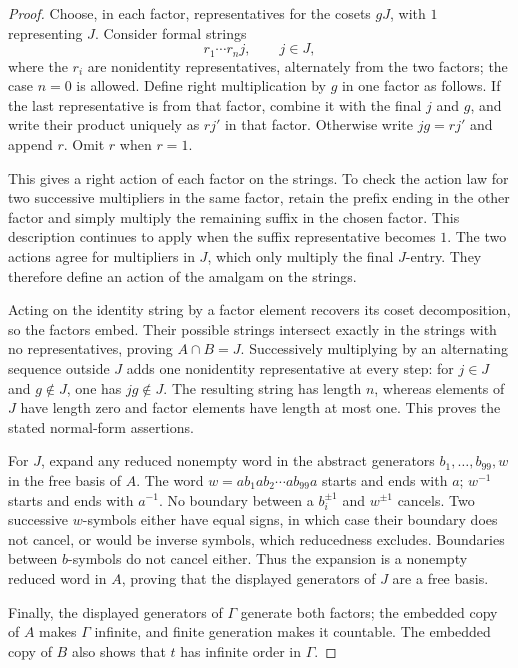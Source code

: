 \begin{proof}
Choose, in each factor, representatives for the cosets $gJ$, with $1$
representing $J$.  Consider formal strings
\[
 r_1\cdots r_n j,
 \qquad j\in J,
\]
where the $r_i$ are nonidentity representatives, alternately from the
two factors; the case $n=0$ is allowed.  Define right multiplication by
$g$ in one factor as follows.  If the last representative is from that
factor, combine it with the final $j$ and $g$, and write their product
uniquely as $rj'$ in that factor.  Otherwise write $jg=rj'$ and append
$r$.  Omit $r$ when $r=1$.

This gives a right action of each factor on the strings.  To check the
action law for two successive multipliers in the same factor, retain
the prefix ending in the other factor and simply multiply the remaining
suffix in the chosen factor.  This description continues to apply when
the suffix representative becomes $1$.  The two actions agree for
multipliers in $J$, which only multiply the final $J$-entry.  They
therefore define an action of the amalgam on the strings.

Acting on the identity string by a factor element recovers its coset
decomposition, so the factors embed.  Their possible strings intersect
exactly in the strings with no representatives, proving $A\cap B=J$.
Successively multiplying by an alternating sequence outside $J$
adds one nonidentity representative at every step: for $j\in J$ and
$g\notin J$, one has $jg\notin J$.  The resulting string has length
$n$, whereas elements of $J$ have length zero and factor elements have
length at most one.  This proves the stated normal-form assertions.

For $J$, expand any reduced nonempty word in the abstract generators
$b_1,\ldots,b_{99},w$ in the free basis of $A$.
The word $w=ab_1ab_2\cdots ab_{99}a$ starts and ends with $a$;
$w^{-1}$ starts and ends with $a^{-1}$.  No boundary between a
$b_i^{\pm1}$ and $w^{\pm1}$ cancels.  Two successive $w$-symbols
either have equal signs, in which case their boundary does not cancel,
or would be inverse symbols, which reducedness excludes.  Boundaries
between $b$-symbols do not cancel either.  Thus the expansion is a
nonempty reduced word in $A$, proving that the displayed generators of
$J$ are a free basis.

Finally, the displayed generators of $\Gamma$ generate both factors;
the embedded copy of $A$ makes $\Gamma$ infinite, and finite generation
makes it countable.  The embedded copy of $B$ also shows that $t$ has
infinite order in $\Gamma$.
\end{proof}

